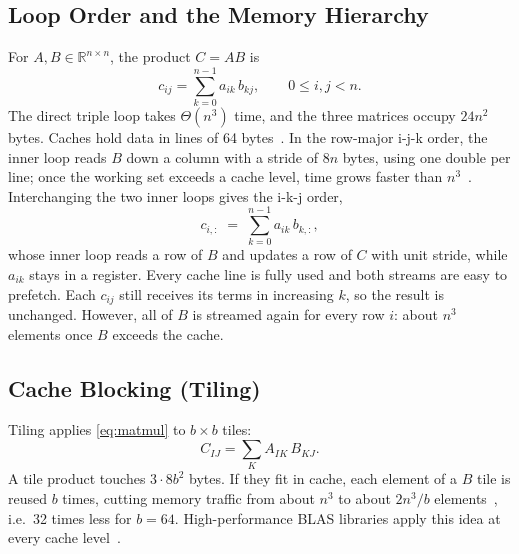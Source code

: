 \documentclass[conference,a4paper]{IEEEtran}
\begin{document}
\subsection{Loop Order and the Memory Hierarchy}
For $A, B \in \mathbb{R}^{n \times n}$, the product $C = AB$ is
\begin{equation}
  c_{ij} = \sum_{k=0}^{n-1} a_{ik}\, b_{kj}, \qquad 0 \le i, j < n.
  \label{eq:matmul}
\end{equation}
The direct triple loop takes $\Theta(n^3)$ time, and the three matrices occupy
$24n^2$ bytes. Caches hold data in lines of 64
bytes~\cite{hennessy2017,drepper2007}. In the row-major i-j-k order, the inner
loop reads $B$ down a column with a stride of $8n$ bytes, using one double per
line; once the working set exceeds a cache level, time grows faster than
$n^3$~\cite{lam1991}. Interchanging the two inner loops gives the i-k-j order,
\begin{equation}
  c_{i,:} \;=\; \sum_{k=0}^{n-1} a_{ik}\, b_{k,:},
  \label{eq:ikj}
\end{equation}
whose inner loop reads a row of $B$ and updates a row of $C$ with unit stride,
while $a_{ik}$ stays in a register. Every cache line is fully used and both
streams are easy to prefetch. Each $c_{ij}$ still receives its terms in
increasing $k$, so the result is unchanged. However, all of $B$ is streamed
again for every row $i$: about $n^3$ elements once $B$ exceeds the cache.

\subsection{Cache Blocking (Tiling)}
Tiling applies \eqref{eq:matmul} to $b \times b$ tiles:
\begin{equation}
  C_{IJ} = \sum_{K} A_{IK}\, B_{KJ}.
  \label{eq:tiled}
\end{equation}
A tile product touches $3 \cdot 8b^2$ bytes. If they fit in cache, each element
of a $B$ tile is reused $b$ times, cutting memory traffic from about $n^3$ to
about $2n^3/b$ elements~\cite{lam1991,wolf1991}, i.e.\ 32 times less for
$b = 64$. High-performance BLAS libraries apply this idea at every cache
level~\cite{goto2008}.
\end{document}
